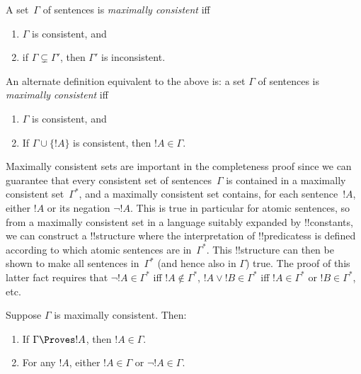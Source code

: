 \documentclass[../../include/open-logic-section]{subfiles}
\begin{document}

\begin{defn}
A set~$\Gamma$ of sentences is \emph{maximally consistent} iff
\begin{enumerate}
\item $\Gamma$ is consistent, and
\item if $\Gamma \subsetneq \Gamma'$, then $\Gamma'$ is inconsistent.
\end{enumerate}
\end{defn}

\begin{digress}
An alternate definition equivalent to the above is: a set $\Gamma$ of
sentences is \emph{maximally consistent} iff
\begin{enumerate}
\item $\Gamma$ is consistent, and
\item If $\Gamma \cup \{ !A \}$ is consistent, then $!A \in \Gamma$.
\end{enumerate}
\end{digress}

\begin{explain}
Maximally consistent sets are important in the completeness proof
since we can guarantee that every consistent set of sentences~$\Gamma$
is contained in a maximally consistent set~$\Gamma^*$, and a maximally
consistent set contains, for each sentence~$!A$, either $!A$ or its
negation $\lnot !A$.  This is true in particular for atomic sentences,
so from a maximally consistent set in a language suitably expanded by
!!{constant}s, we can construct a !!{structure} where the
interpretation of !!{predicates}s is defined according to which atomic
sentences are in~$\Gamma^*$. This !!{structure} can then be shown to
make all sentences in~$\Gamma^*$ (and hence also in $\Gamma$)
true. The proof of this latter fact requires that $\lnot !A \in
\Gamma^*$ iff $!A \notin \Gamma^*$, $!A \lor !B \in \Gamma^*$ iff $!A
\in \Gamma^*$ or $!B \in \Gamma^*$, etc.
\end{explain}

\begin{prop}
Suppose $\Gamma$ is maximally consistent. Then:
\begin{enumerate}
\item {} If $\Gamma \Proves !A$, then $!A \in
  \Gamma$.

\item {} For any $!A$, either $!A \in
  \Gamma$ or $\lnot !A \in \Gamma$.



\end{enumerate}
\end{prop}
\end{document}
